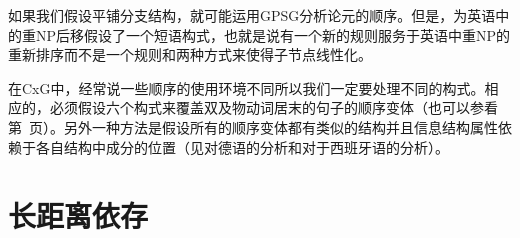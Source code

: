 如果我们假设平铺分支结构，就可能运用GPSG分析\indexgpsgc 论元的顺序。但是，\citet{Kay2002a}为英语中的重NP后移假设了一个短语构式，也就是说有一个新的规则服务于英语中重NP的重新排序而不是一个规则和两种方式来使得子节点线性化。

在CxG中，经常说一些顺序的使用环境不同所以我们一定要处理不同的构式。相应的，必须假设六个构式来覆盖双及物动词居末的句子的顺序变体（也可以参看第~\pageref{Regeln-PSG-Abfolge}页）。另外一种方法是假设所有的顺序变体都有类似的结构并且信息结构属性依赖于各自结构中成分的位置（见\citealp{deKuthy2000a}对德语的分析和\citealp{Bildhauer2008a}对于西班牙语的分析）。

\section{长距离依存}

